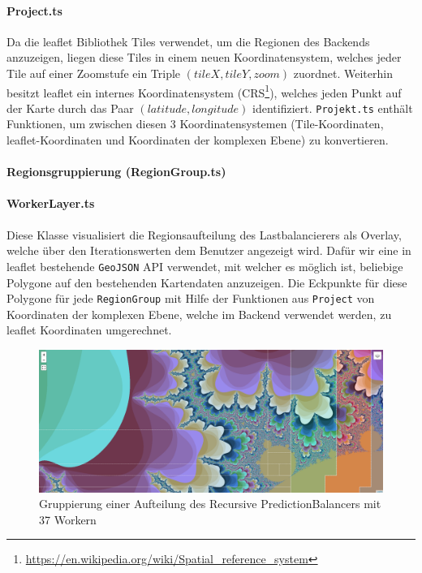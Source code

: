 \paragraph{Project.ts}
Da die leaflet Bibliothek Tiles verwendet, um die Regionen des Backends anzuzeigen, liegen diese Tiles in 
einem neuen Koordinatensystem, welches jeder Tile auf einer Zoomstufe ein Triple \( (tileX, tileY, zoom) \)
zuordnet. Weiterhin besitzt leaflet ein internes Koordinatensystem (CRS\footnote{\url{https://en.wikipedia.org/wiki/Spatial_reference_system}}),
welches jeden Punkt auf der Karte durch das Paar \( (latitude, longitude) \) identifiziert. 
\verb|Projekt.ts| enthält Funktionen, um zwischen diesen 3 Koordinatensystemen (Tile-Koordinaten, leaflet-Koordinaten 
und Koordinaten der komplexen Ebene) zu konvertieren.

\paragraph{Regionsgruppierung (RegionGroup.ts)}\label{par:regionGroup}

\paragraph{WorkerLayer.ts}\label{par:workerLayer}
Diese Klasse visualisiert die Regionsaufteilung des Lastbalancierers als Overlay, welche über den Iterationswerten
dem Benutzer angezeigt wird. Dafür wir eine in leaflet bestehende \verb|GeoJSON| API verwendet, mit welcher es möglich
ist, beliebige Polygone auf den bestehenden Kartendaten anzuzeigen. Die Eckpunkte für diese Polygone für jede \verb|RegionGroup| 
mit Hilfe der Funktionen aus \verb|Project| von Koordinaten der komplexen Ebene, welche im Backend verwendet werden, zu 
leaflet Koordinaten umgerechnet.

\begin{figure}[h!]
	\centering
	\includegraphics[width=\linewidth]{img/Implementierung/regionGrouping}
	\caption{Gruppierung einer Aufteilung des Recursive PredictionBalancers mit 37 Workern}
	\label{fig:regionGrouping}
\end{figure}

